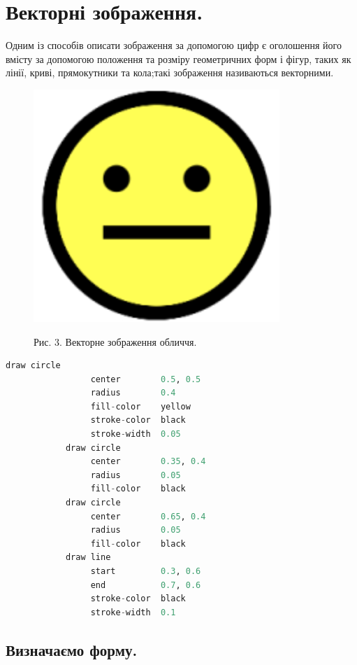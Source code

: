 \documentclass[11pt]{article}
\begin{document}
    \section{Векторні зображення.}\label{sec:vector_images}
    Одним із способів описати зображення за допомогою цифр є оголошення його вмісту за допомогою положення та розміру геометричних форм і фігур, таких як лінії, криві, прямокутники та кола;такі зображення називаються векторними.

    \begin{figure}
        \label{fig:image3}
        \centering
        \includegraphics[scale=0.5]{image3.png}

        Рис. 3. Векторне зображення обличчя.
    \end{figure}

    \begin{lstlisting}[style=light, language=Python,label={lst:vectorimg},caption=Приклад векторного зображення]
            draw circle
                 center        0.5, 0.5
                 radius        0.4
                 fill-color    yellow
                 stroke-color  black
                 stroke-width  0.05
            draw circle
                 center        0.35, 0.4
                 radius        0.05
                 fill-color    black
            draw circle
                 center        0.65, 0.4
                 radius        0.05
                 fill-color    black
            draw line
                 start         0.3, 0.6
                 end           0.7, 0.6
                 stroke-color  black
                 stroke-width  0.1
    \end{lstlisting}

    \subsection{Визначаємо форму.}\label{subsec:defining_shapes}
\end{document}
